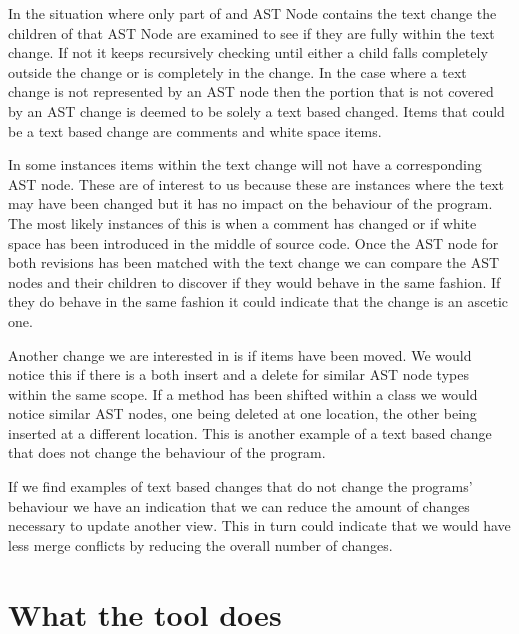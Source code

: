 In the situation where only part of and AST Node contains the text change the children of that AST Node are examined to see if they are fully within the text change.  If not it keeps recursively checking until either a child falls completely outside the change or is completely in the change.  In the case where a text change is not represented by an AST node then the portion that is not covered by an AST change is deemed to be solely a text based changed.  Items that could be a text based change are comments and white space items.

In some instances items within the text change will not have a corresponding AST node.  These are of interest to us because these are instances where the text may have been changed but it has no impact on the behaviour of the program.  The most likely instances of this is when a comment has changed or if white space has been introduced in the middle of source code. Once the AST node for both revisions has been matched with the text change we can compare the AST nodes and their children to discover if they would behave in the same fashion. If they do behave in the same fashion it could indicate that the change is an ascetic one.

Another change we are interested in is if items have been moved.  We would notice this if there is a both insert and a delete for similar AST node types within the same scope.  If a method has been shifted within a class we would notice similar AST nodes, one being deleted at one location, the other being inserted at a different location.  This is another example of a text based change that does not change the behaviour of the program.


If we find examples of text based changes that do not change the programs' behaviour we have an indication that we can reduce the amount of changes necessary to update another view. This in turn could indicate that we would have less merge conflicts by reducing the overall number of changes.

% 

\section{What the tool does}

